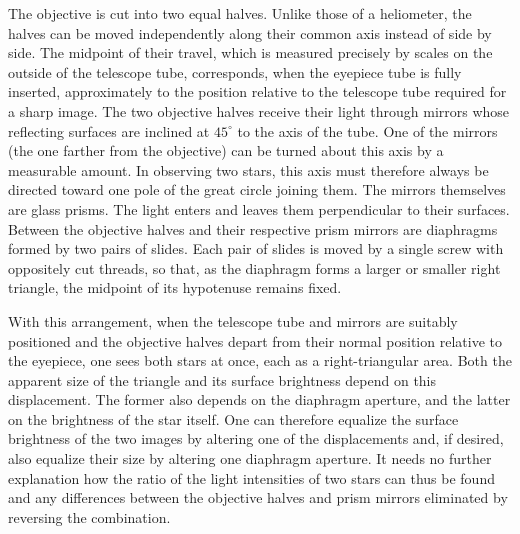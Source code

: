 The objective is cut into two equal halves. Unlike those of a heliometer, the halves can be moved independently along their common axis instead of side by side. The midpoint of their travel, which is measured precisely by scales on the outside of the telescope tube, corresponds, when the eyepiece tube is fully inserted, approximately to the position relative to the telescope tube required for a sharp image. The two objective halves receive their light through mirrors whose reflecting surfaces are inclined at $45^\circ$ to the axis of the tube. One of the mirrors (the one farther from the objective) can be turned about this axis by a measurable amount. In observing two stars, this axis must therefore always be directed toward one pole of the great circle joining them. The mirrors themselves are glass prisms. The light enters and leaves them perpendicular to their surfaces. Between the objective halves and their respective prism mirrors are diaphragms formed by two pairs of slides. Each pair of slides is moved by a single screw with oppositely cut threads, so that, as the diaphragm forms a larger or smaller right triangle, the midpoint of its hypotenuse remains fixed.

With this arrangement, when the telescope tube and mirrors are suitably positioned and the objective halves depart from their normal position relative to the eyepiece, one sees both stars at once, each as a right-triangular area. Both the apparent size of the triangle and its surface brightness depend on this displacement. The former also depends on the diaphragm aperture, and the latter on the brightness of the star itself. One can therefore equalize the surface brightness of the two images by altering one of the displacements and, if desired, also equalize their size by altering one diaphragm aperture. It needs no further explanation how the ratio of the light intensities of two stars can thus be found and any differences between the objective halves and prism mirrors eliminated by reversing the combination.

